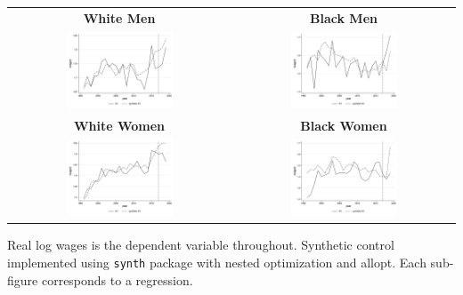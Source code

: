 \documentclass[11pt]{article}
\begin{document}
{\pagebreak
\begin{landscape}
\begin{table}[ht!]
    \centering
    \label{fig:synth_ky}
    \begin{tabular}{c c}
          \textbf{White Men} & \textbf{Black Men} \\    
          \includegraphics[width = 0.5\textwidth, keepaspectratio]{figures/fin_synth_wm_ky.png} & \includegraphics[width = 0.5\textwidth, keepaspectratio]{figures/fin_synth_bm_ky.png} \\
          \textbf{White Women} & \textbf{Black Women} \\
          \includegraphics[width = 0.5\textwidth, keepaspectratio]{figures/fin_synth_wf_ky.png} & \includegraphics[width = 0.5\textwidth, keepaspectratio]{figures/fin_synth_bf_ky.png}
    \end{tabular}
\end{table}
\footnotesize{Real log wages is the dependent variable throughout. Synthetic control implemented using \texttt{synth} package with nested optimization and allopt. Each sub-figure corresponds to a regression.}
\end{landscape}

}
\end{document}
